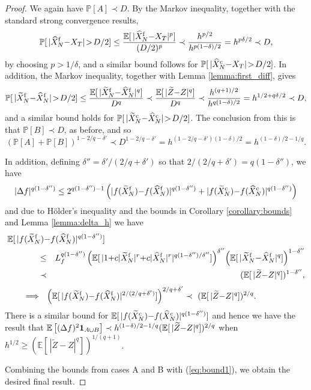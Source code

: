 \documentclass[11pt]{article}
\def \EE {{\mathbb{E}}}
\def \PP {{\mathbb{P}}}
\def \one {{\bf 1}}
\def \tZ {{\widetilde{Z}}}
\def \tXf  {{\widetilde{X}^{\rm f}}}
\def \tXc  {{\widetilde{X}^{\rm c}}}
\def \hXf {{\widehat{X}^{\rm f}}}
\def \hXc {{\widehat{X}^{\rm c}}}
\begin{document}
\begin{proof}
We again have $\PP[A] \prec D$.  By the Markov inequality,
together with the standard strong convergence results,
\[
\PP[\, |\hXf_N {-} X_T| \!>\! D/2] 
\leq \frac{\EE[\, |\hXf_N {-} X_T|^p]}{(D/2)^p}
\prec \frac{h^{p/2}}{h^{p(1-\delta)/2}}
= h^{p\delta/2}
\prec D,
\]
by choosing $p\!>\!1/\delta$, and a similar bound follows for
$\PP[\, |\hXc_N {-} X_T| \!>\! D/2]$.
In addition, the Markov inequality, together with Lemma \ref{lemma:first_diff}, gives
\[
\PP[\, |\tXf_N {-} \hXf_N| \!>\! D/2] 
\leq \frac{\EE[\, |\tXf_N {-} \hXf_N|^q]}{D^q}
\prec \frac{\EE[\, |\tZ{-}Z|^q]}{D^q} 
\prec \frac{h^{(q+1)/2}}{h^{q(1-\delta)/2}}
= h^{1/2+q\delta/2}
\prec D,
\]
and a similar bound holds for $\PP[\, |\tXc_N {-} \hXc_N| \!>\! D/2]$.
The conclusion from this is that $\PP[B]\prec D$, as before, and so
\[
\left( \PP[A] + \PP[B] \right)^{1-2/q-\delta'}
\prec D^{1-2/q-\delta'}
=  h^{(1-2/q-\delta')(1-\delta)/2}
= h^{(1-\delta)/2 - 1/q}.
\]

In addition, defining $\delta''=\delta'/(2/q{+}\delta')$ so that
$2/(2/q+\delta')=q(1{-}\delta'')$, we have
\[
|\Delta f|^{q(1{-}\delta'')} \leq 2^{q(1{-}\delta'')-1}\left(
  |f(\tXf_N) {-} f(\hXf_N)|^{q(1{-}\delta'')} + |f(\tXc_N) {-} f(\hXc_N)|^{q(1{-}\delta'')}
  \right)
\]
and due to H\"older's inequality and the bounds in Corollary \ref{corollary:bounds}
and Lemma \ref{lemma:delta_h} we have
\begin{eqnarray*}
\lefteqn{\hspace*{-0.5in}
\EE[\, |f(\tXf_N) {-} f(\hXf_N)|^{q(1-\delta'')}]
}
\\ \hspace*{0.5in}
  &\leq& L_f^{q(1-\delta'')} \left( \EE[\, |1 {+} c |\tXf_N|^r {+} c |\hXf_N|^r|^{q(1-\delta'')/\delta''}]\right)^{\delta''}
  \!     \left( \EE[\, |\tXf_N {-} \hXf_N|^q]\right)^{1-\delta''}
\\ &\prec&  (\EE[\, |\tZ{-}Z|^q])^{1-\delta''},
\end{eqnarray*}
\[
\hspace*{-0.5in}  
\Longrightarrow ~~ \left( \EE[\,|f(\tXf_N) {-} f(\hXf_N)|^{2/(2/q+\delta')}] \right)^{2/q+\delta'}
\prec\ (\EE[\, |\tZ{-}Z|^q])^{2/q}.
\]
There is a similar bound for $\EE[\, |f(\tXc_N) {-} f(\hXc_N)|^{q(1-\delta'')}]$
and hence we have the result that 
$\EE\left[ (\Delta f)^2 \one_{A\cup B} \right]
\prec h^{(1-\delta)/2-1/q} (\EE[\, |\tZ{-}Z|^q])^{2/q}$
when $h^{1/2} \geq (\EE[\, |\tZ{-}Z|^q])^{1/(q+1)}$.

Combining the bounds from cases A and B with (\ref{eq:bound1}),
we obtain the desired final result.
\end{proof}
\end{document}
